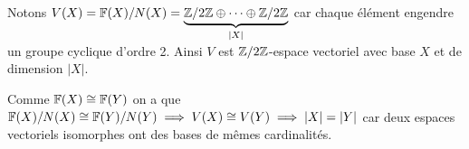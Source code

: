 \begin{preuve}
\begin{description}
        Notons $V(X) = \mathbb{F}(X)/N(X) = \underbrace{\mathbb{Z}/2\mathbb{Z} \oplus \cdots \oplus \mathbb{Z}/2\mathbb{Z}}_{|X|}$ car chaque élément
        engendre un groupe cyclique d'ordre 2. Ainsi $V$ est $\mathbb{Z}/2\mathbb{Z}$-espace vectoriel avec base $X$ et de
        dimension $|X|$.

        Comme $\mathbb{F}(X) \cong \mathbb{F}(Y)$ on a que $\mathbb{F}(X)/N(X) \cong \mathbb{F}(Y)/N(Y) \implies V(X) \cong V(Y) \implies
        |X|=|Y|$ car deux espaces vectoriels isomorphes ont des bases de mêmes cardinalités.
      \end{description}
    \end{preuve}

    

    

    
  





